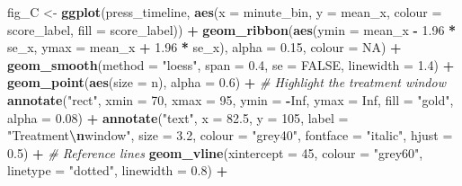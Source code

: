 \documentclass[
]{article}
\newenvironment{Shaded}{\begin{snugshade}}{\end{snugshade}}
\newcommand{\AttributeTok}[1]{\textcolor[rgb]{0.13,0.29,0.53}{#1}}
\newcommand{\CommentTok}[1]{\textcolor[rgb]{0.56,0.35,0.01}{\textit{#1}}}
\newcommand{\ConstantTok}[1]{\textcolor[rgb]{0.56,0.35,0.01}{#1}}
\newcommand{\DecValTok}[1]{\textcolor[rgb]{0.00,0.00,0.81}{#1}}
\newcommand{\FloatTok}[1]{\textcolor[rgb]{0.00,0.00,0.81}{#1}}
\newcommand{\FunctionTok}[1]{\textcolor[rgb]{0.13,0.29,0.53}{\textbf{#1}}}
\newcommand{\NormalTok}[1]{#1}
\newcommand{\OtherTok}[1]{\textcolor[rgb]{0.56,0.35,0.01}{#1}}
\newcommand{\SpecialCharTok}[1]{\textcolor[rgb]{0.81,0.36,0.00}{\textbf{#1}}}
\newcommand{\StringTok}[1]{\textcolor[rgb]{0.31,0.60,0.02}{#1}}
\begin{document}
\begin{Shaded}
\begin{Highlighting}[]
\NormalTok{fig\_C }\OtherTok{\textless{}{-}} \FunctionTok{ggplot}\NormalTok{(press\_timeline,}
                \FunctionTok{aes}\NormalTok{(}\AttributeTok{x =}\NormalTok{ minute\_bin, }\AttributeTok{y =}\NormalTok{ mean\_x,}
                    \AttributeTok{colour =}\NormalTok{ score\_label, }\AttributeTok{fill =}\NormalTok{ score\_label)) }\SpecialCharTok{+}
  \FunctionTok{geom\_ribbon}\NormalTok{(}\FunctionTok{aes}\NormalTok{(}\AttributeTok{ymin =}\NormalTok{ mean\_x }\SpecialCharTok{{-}} \FloatTok{1.96} \SpecialCharTok{*}\NormalTok{ se\_x,}
                  \AttributeTok{ymax =}\NormalTok{ mean\_x }\SpecialCharTok{+} \FloatTok{1.96} \SpecialCharTok{*}\NormalTok{ se\_x),}
              \AttributeTok{alpha =} \FloatTok{0.15}\NormalTok{, }\AttributeTok{colour =} \ConstantTok{NA}\NormalTok{) }\SpecialCharTok{+}
  \FunctionTok{geom\_smooth}\NormalTok{(}\AttributeTok{method =} \StringTok{"loess"}\NormalTok{, }\AttributeTok{span =} \FloatTok{0.4}\NormalTok{, }\AttributeTok{se =} \ConstantTok{FALSE}\NormalTok{, }\AttributeTok{linewidth =} \FloatTok{1.4}\NormalTok{) }\SpecialCharTok{+}
  \FunctionTok{geom\_point}\NormalTok{(}\FunctionTok{aes}\NormalTok{(}\AttributeTok{size =}\NormalTok{ n), }\AttributeTok{alpha =} \FloatTok{0.6}\NormalTok{) }\SpecialCharTok{+}
  \CommentTok{\# Highlight the treatment window}
  \FunctionTok{annotate}\NormalTok{(}\StringTok{"rect"}\NormalTok{, }\AttributeTok{xmin =} \DecValTok{70}\NormalTok{, }\AttributeTok{xmax =} \DecValTok{95}\NormalTok{, }\AttributeTok{ymin =} \SpecialCharTok{{-}}\ConstantTok{Inf}\NormalTok{, }\AttributeTok{ymax =} \ConstantTok{Inf}\NormalTok{,}
           \AttributeTok{fill =} \StringTok{"gold"}\NormalTok{, }\AttributeTok{alpha =} \FloatTok{0.08}\NormalTok{) }\SpecialCharTok{+}
  \FunctionTok{annotate}\NormalTok{(}\StringTok{"text"}\NormalTok{, }\AttributeTok{x =} \FloatTok{82.5}\NormalTok{, }\AttributeTok{y =} \DecValTok{105}\NormalTok{,}
           \AttributeTok{label =} \StringTok{"Treatment}\SpecialCharTok{\textbackslash{}n}\StringTok{window"}\NormalTok{, }\AttributeTok{size =} \FloatTok{3.2}\NormalTok{,}
           \AttributeTok{colour =} \StringTok{"grey40"}\NormalTok{, }\AttributeTok{fontface =} \StringTok{"italic"}\NormalTok{, }\AttributeTok{hjust =} \FloatTok{0.5}\NormalTok{) }\SpecialCharTok{+}
  \CommentTok{\# Reference lines}
  \FunctionTok{geom\_vline}\NormalTok{(}\AttributeTok{xintercept =} \DecValTok{45}\NormalTok{, }\AttributeTok{colour =} \StringTok{"grey60"}\NormalTok{, }\AttributeTok{linetype =} \StringTok{"dotted"}\NormalTok{, }\AttributeTok{linewidth =} \FloatTok{0.8}\NormalTok{) }\SpecialCharTok{+}

\end{Highlighting}
\end{Shaded}
\end{document}
